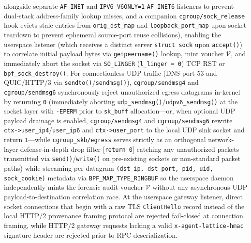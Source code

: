 \documentclass[conference,10pt]{IEEEtran}
\begin{document}
alongside separate \texttt{AF\_INET} and \texttt{IPV6\_V6ONLY=1} \texttt{AF\_INET6} listeners to prevent dual-stack address-family lookup misses, and a companion \texttt{cgroup/sock\_release} hook evicts stale entries from \texttt{orig\_dst\_map} and \texttt{loopback\_port\_map} upon socket teardown to prevent ephemeral source-port reuse collisions), enabling the userspace listener (which receives a distinct server \texttt{struct sock} upon \texttt{accept()}) to correlate initial payload bytes via \texttt{getpeername()} lookup, mint voucher $\mathcal{V}$, and immediately abort the socket via \texttt{SO\_LINGER} (\texttt{l\_linger = 0}) TCP RST or \texttt{bpf\_sock\_destroy()}. For connectionless UDP traffic (DNS port 53 and QUIC/HTTP/3 via \texttt{sendto()}/\texttt{sendmsg()}), \texttt{cgroup/sendmsg4} and \texttt{cgroup/sendmsg6} synchronously reject unauthorized egress datagrams in-kernel by returning \texttt{0} (immediately aborting \texttt{udp\_sendmsg()}/\texttt{udpv6\_sendmsg()} at the socket layer with \texttt{-EPERM} prior to \texttt{sk\_buff} allocation---or, when optional UDP payload drainage is enabled, \texttt{cgroup/sendmsg4} and \texttt{cgroup/sendmsg6} rewrite \texttt{ctx->user\_ip4}/\texttt{user\_ip6} and \texttt{ctx->user\_port} to the local UDP sink socket and return \texttt{1}---while \texttt{cgroup\_skb/egress} serves strictly as an orthogonal network-layer defense-in-depth drop filter [\texttt{return 0}] catching any unauthorized packets transmitted via \texttt{send()}/\texttt{write()} on pre-existing sockets or non-standard packet paths) while streaming per-datagram \texttt{(dst\_ip, dst\_port, pid, uid, sock\_cookie)} metadata via \texttt{BPF\_MAP\_TYPE\_RINGBUF} so the userspace daemon independently mints the forensic audit voucher $\mathcal{V}$ without any asynchronous UDP payload-to-destination correlation race. At the userspace gateway listener, direct socket connections that begin with a raw TLS \texttt{ClientHello} record instead of the local HTTP/2 provenance framing protocol are rejected fail-closed at connection framing, while HTTP/2 gateway requests lacking a valid \texttt{x-agent-lattice-hmac} signature header are rejected prior to RPC deserialization.
\end{document}
